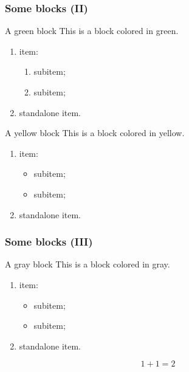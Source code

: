 \begin{frame}
\frametitle{Some blocks (II)}
\begin{exampleblock}{A green block}
This is a block colored in green.

\begin{enumerate}
\item {} item:
\begin{enumerate}
\item {} subitem;
\item {} subitem;
\end{enumerate}
\item {} standalone item.
\end{enumerate}
\end{exampleblock}

\begin{remarkblock}{A yellow block}
This is a block colored in yellow.

\begin{enumerate}
\item {} item:
\begin{itemize}
\item {} subitem;
\item {} subitem;
\end{itemize}
\item {} standalone item.
\end{enumerate}
\end{remarkblock}
\end{frame}

\begin{frame}
\frametitle{Some blocks (III)}
\begin{proofblock}{A gray block}
This is a block colored in gray.

\begin{enumerate}
\item {} item:
\begin{itemize}
\item {} subitem;
\item {} subitem;
\end{itemize}
\item {} standalone item.
\end{enumerate}

\begin{equation}
1 + 1 = 2
\label{eq:1p1e2_chap2}
\end{equation}
\end{proofblock}
\end{frame}
